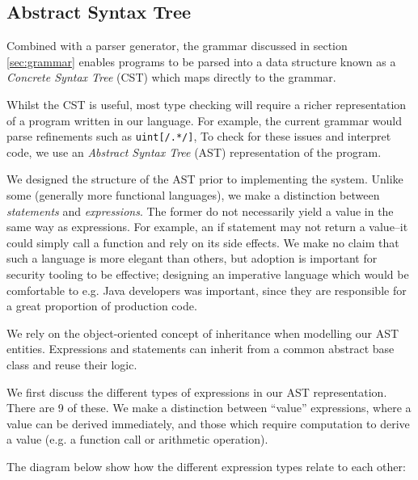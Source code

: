 \documentclass[a4paper,openany,12pt]{book}
\begin{document}
\label{sec:grammar}

\subsection{Abstract Syntax Tree}

Combined with a parser generator, the grammar discussed in section \ref{sec:grammar} enables programs to be parsed into
a data structure known as a \emph{Concrete Syntax Tree} (CST) which maps directly to the grammar.

Whilst the CST is useful, most type checking will require a richer representation of a program written in our language.
For example, the current grammar would parse refinements such as \textcolor{id7-ruby-red}{\texttt{uint}}\texttt{[/.*/]},
To check for these issues and interpret code, we use an \emph{Abstract Syntax Tree} (AST) representation of the program.

We designed the structure of the AST prior to implementing the system.
Unlike some (generally more functional languages), we make a distinction between \textit{statements} and
\textit{expressions}.
The former do not necessarily yield a value in the same way as expressions.
For example, an if statement may not return a value--it could simply call a function and rely on its side effects.
We make no claim that such a language is more elegant than others, but adoption is important for security tooling
to be effective; designing an imperative language which would be comfortable to e.g. Java developers was important,
since they are responsible for a great proportion of production code.

We rely on the object-oriented concept of inheritance when modelling our AST entities.
Expressions and statements can inherit from a common abstract base class and reuse their logic.

We first discuss the different types of expressions in our AST representation.
There are 9 of these.
We make a distinction between ``value'' expressions, where a value can be derived immediately, and those which require
computation to derive a value (e.g. a function call or arithmetic operation).

The diagram below show how the different expression types relate to each other:
\end{document}
